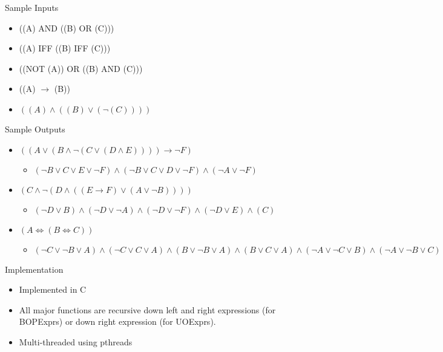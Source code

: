 \documentclass{beamer}
\begin{document}
\begin{frame}{Sample Inputs}
    \begin{itemize}
        \setlength\itemsep{1em}
        \item ((A) AND ((B) OR (C)))
        \item ((A) IFF ((B) IFF (C)))
        \item ((NOT (A)) OR ((B) AND (C)))
        \item ((A) $\rightarrow$ (B))
        \item $((A) \land ((B) \lor ( \lnot (C))))$
    \end{itemize}
\end{frame}

\begin{frame}{Sample Outputs}
    \begin{itemize}
        \setlength\itemsep{2em}
        \item $((A \lor (B \land \lnot(C \lor (D \land E)))) \rightarrow \lnot F)$
        \begin{itemize}
            \item $(\lnot B \lor C \lor E \lor \lnot F) \land (\lnot B \lor C \lor D \lor \lnot F) \land (\lnot A \lor \lnot F)$
        \end{itemize}
        
        \item $(C \land \lnot (D \land ((E \rightarrow F) \lor (A \lor \lnot B))))$
        \begin{itemize}
            \item $(\lnot D \lor B) \land (\lnot D \lor \lnot A) \land (\lnot D \lor \lnot F) \land (\lnot D \lor E) \land (C)$
        \end{itemize}
        
        \item $(A \Leftrightarrow  (B \Leftrightarrow  C))$
        \begin{itemize}
            \item $(\lnot C \lor \lnot B \lor A) \land (\lnot C \lor C \lor A) \land (B \lor \lnot B \lor A) \land (B \lor C \lor A) \land (\lnot A \lor \lnot C \lor B) \land (\lnot A \lor \lnot B \lor C)$ 
        \end{itemize}
    \end{itemize}
\end{frame}

\begin{frame}{Implementation}
    \begin{itemize}
        \setlength\itemsep{1em}
        \item Implemented in C
        \item All major functions are recursive down left and right expressions (for BOPExprs) or down right expression (for UOExprs).
        \item Multi-threaded using pthreads
    \end{itemize}
\end{frame}
\end{document}
